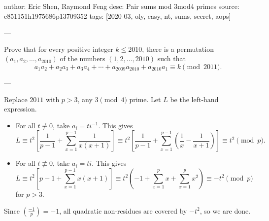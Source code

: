 author: Eric Shen, Raymond Feng
desc: Pair sums mod 3mod4 primes
source: c851151h1975686p13709352
tags: [2020-03, oly, easy, nt, sums, secret, aops]

---

Prove that for every positive integer $k\le2010$, there is a permutation $(a_1,a_2,\ldots,a_{2010})$ of the numbers $(1,2,\ldots,2010)$ such that \[a_1a_2+a_2a_3+a_3a_4+\cdots+a_{2009}a_{2010}+a_{2010}a_1\equiv k\pmod{2011}.\]

---

Replace $2011$ with $p>3$, any $3\pmod4$ prime. Let $L$ be the left-hand expression.
\begin{itemize}
    \item For all $t\not\equiv0$, take $a_i=ti^{-1}$. This gives\[L\equiv t^2\left[\frac1{p-1}+\sum_{x=1}^{p-1}\frac1{x(x+1)}\right]\equiv t^2\left[\frac1{p-1}+\sum_{x=1}^{p-1}\left(\frac1x-\frac1{x+1}\right)\right]\equiv t^2\pmod p.\]

    \item For all $t\not\equiv0$, take $a_i=ti$. This gives\[L\equiv t^2\left[p-1+\sum_{x=1}^{p-1}x(x+1)\right]\equiv t^2\left(-1+\sum_{x=1}^p x+\sum_{x=1}^p x^2\right)\equiv -t^2\pmod p\]for $p>3$.
\end{itemize}
Since $\left(\frac{-1}p\right)=-1$, all quadratic non-residues are covered by $-t^2$, so we are done.
